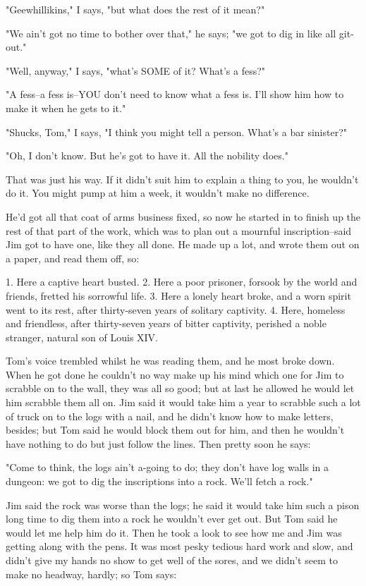 "Geewhillikins," I says, "but what does the rest of it mean?"

"We ain't got no time to bother over that," he says; "we got to dig in
like all git-out."

"Well, anyway," I says, "what's SOME of it?  What's a fess?"

"A fess--a fess is--YOU don't need to know what a fess is.  I'll show him
how to make it when he gets to it."

"Shucks, Tom," I says, "I think you might tell a person.  What's a bar
sinister?"

"Oh, I don't know.  But he's got to have it.  All the nobility does."

That was just his way.  If it didn't suit him to explain a thing to you,
he wouldn't do it.  You might pump at him a week, it wouldn't make no
difference.

He'd got all that coat of arms business fixed, so now he started in to
finish up the rest of that part of the work, which was to plan out a
mournful inscription--said Jim got to have one, like they all done.  He
made up a lot, and wrote them out on a paper, and read them off, so:

1.  Here a captive heart busted. 2.  Here a poor prisoner, forsook by the
world and friends, fretted his sorrowful life. 3.  Here a lonely heart
broke, and a worn spirit went to its rest, after thirty-seven years of
solitary captivity. 4.  Here, homeless and friendless, after thirty-seven
years of bitter captivity, perished a noble stranger, natural son of
Louis XIV.

Tom's voice trembled whilst he was reading them, and he most broke down.
When he got done he couldn't no way make up his mind which one for Jim to
scrabble on to the wall, they was all so good; but at last he allowed he
would let him scrabble them all on.  Jim said it would take him a year to
scrabble such a lot of truck on to the logs with a nail, and he didn't
know how to make letters, besides; but Tom said he would block them out
for him, and then he wouldn't have nothing to do but just follow the
lines.  Then pretty soon he says:

"Come to think, the logs ain't a-going to do; they don't have log walls
in a dungeon:  we got to dig the inscriptions into a rock.  We'll fetch a
rock."

Jim said the rock was worse than the logs; he said it would take him such
a pison long time to dig them into a rock he wouldn't ever get out.  But
Tom said he would let me help him do it.  Then he took a look to see how
me and Jim was getting along with the pens.  It was most pesky tedious
hard work and slow, and didn't give my hands no show to get well of the
sores, and we didn't seem to make no headway, hardly; so Tom says:

